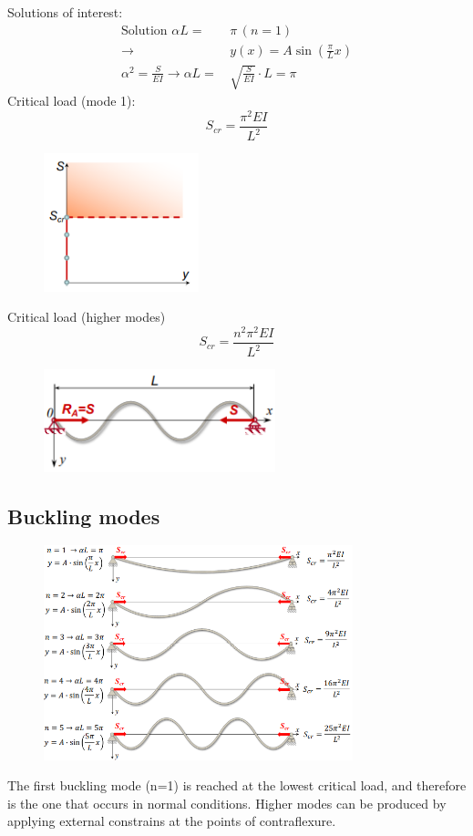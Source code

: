 \documentclass[class=report, crop=false, 12pt,a4paper]{standalone}
\begin{document}
Solutions of interest:
\begin{align}
    \textrm{Solution } \alpha L =\, & \pi \, \left(n=1\right)\\
    \rightarrow \, & y(x) = A\sin\left(\frac{\pi}{L}x\right)\\
    \alpha^2 = \frac{S}{EI} \rightarrow \alpha L =\, & \sqrt{\frac{S}{EI}}\cdot L = \pi
\end{align}
Critical load (mode 1):
\begin{equation}
    S_{cr} = \frac{\pi^2 EI}{L^2}
\end{equation}
\begin{figure}[H]
    \centering
    \includegraphics[width = 0.4\textwidth]{../img/diagram25.png}
    \caption{}
\end{figure}
Critical load (higher modes)
\begin{equation}
    S_{cr} = \frac{n^2 \pi^2 EI}{L^2}
\end{equation}
\begin{figure}[H]
    \centering
    \includegraphics[width = 0.6\textwidth]{../img/diagram26.png}
    \caption{}
\end{figure}
\subsection{Buckling modes}
\begin{figure}[H]
    \centering
    \includegraphics[width = 0.8\textwidth]{../img/diagram27.png}
    \caption{}
\end{figure}
The first buckling mode (n=1) is reached at the lowest critical load, and therefore is the one that occurs in normal conditions. Higher modes can be produced by applying external constrains at the points of contraflexure.
\end{document}
